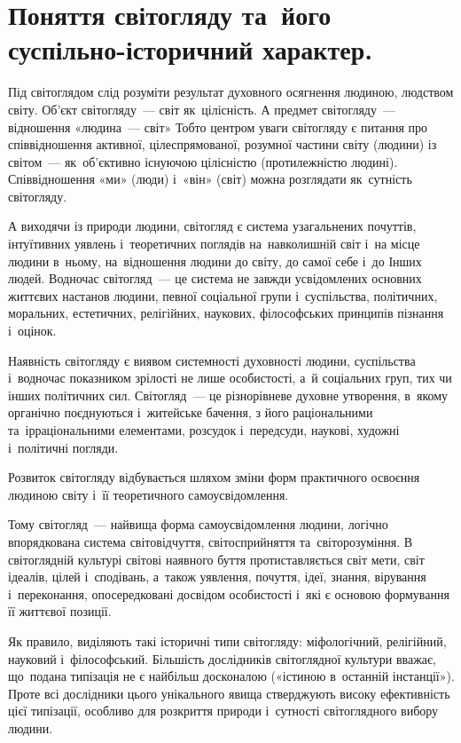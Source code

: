 \documentclass[a5paper,oneside,DIV=12,12pt,headings=small]{scrartcl}
\begin{document}
	\section{Поняття світогляду та~його суспільно-історичний характер.}
		Під світоглядом слід розуміти результат духовного осягнення людиною, людством світу. Об'єкт світогляду~— світ як~цілісність. А предмет світогляду~— відношення «людина~— світ» Тобто центром уваги світогляду є питання про співвідношення активної, цілеспрямованої, розумної частини світу (людини) із світом~— як~об'єктивно існуючою цілісністю (протилежністю людині). Співвідношення «ми» (люди) і~«він» (світ) можна розглядати як~сутність світогляду.
		
		А виходячи із природи людини, світогляд є система узагальнених почуттів, інтуїтивних уявлень і~теоретичних поглядів на~навколишній світ і~на місце людини в~ньому, на~відношення людини до світу, до самої себе і~до Інших людей. Водночас світогляд~— це система не завжди усвідомлених основних життєвих настанов людини, певної соціальної групи і~суспільства, політичних, моральних, естетичних, релігійних, наукових, філософських принципів пізнання і~оцінок.
		
		Наявність світогляду є виявом системності духовності людини, суспільства і~водночас показником зрілості не лише особистості, а~й соціальних груп, тих чи інших політичних сил.
		Світогляд~— це різнорівневе духовне утворення, в~якому органічно поєднуються і~житейське бачення, з його раціональними та~ірраціональними елементами, розсудок і~передсуди, наукові, художні і~політичні погляди.
		
		Розвиток світогляду відбувається шляхом зміни форм практичного освоєння людиною світу і~її теоретичного самоусвідомлення.
		
		Тому світогляд~— найвища форма самоусвідомлення людини, логічно впорядкована система світовідчуття, світосприйняття та~світорозуміння. В світоглядній культурі світові наявного буття протиставляється світ мети, світ ідеалів, цілей і~сподівань, а~також уявлення, почуття, ідеї, знання, вірування і~переконання, опосередковані досвідом особистості і~які є основою формування її життєвої позиції.
		
		Як правило, виділяють такі історичні типи світогляду: міфологічний, релігійний, науковий і~філософський. Більшість дослідників світоглядної культури вважає, що~подана типізація не є найбільш досконалою («істиною в~останній інстанції»). Проте всі дослідники цього унікального явища стверджують високу ефективність цієї типізації, особливо для розкриття природи і~сутності світоглядного вибору людини.
		
\end{document}
